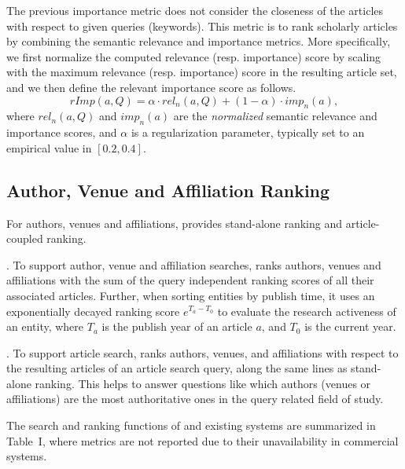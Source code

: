  The previous importance metric does not consider the closeness of the articles with respect to given queries (keywords). This metric is to rank scholarly articles by combining the semantic relevance and importance metrics. More specifically, we first normalize the computed relevance (resp. importance) score by scaling with the maximum relevance (resp. importance) score in the resulting article set, and we then define the relevant importance score as follows.
\begin{equation}
\label{eq:relimp}
rImp(a, Q) = \alpha \cdot rel_n(a, Q) + (1-\alpha)\cdot imp_n(a),
\end{equation}
where $rel_n(a, Q)$ and $imp_n(a)$ are the {\em normalized} semantic relevance and importance scores, and $\alpha$ is a regularization parameter, typically set to an empirical value in $[0.2, 0.4]$.



\subsection{Author, Venue and Affiliation Ranking}
\label{subsec:heteroRanking}

For authors, venues and affiliations,  \oursystem provides stand-alone ranking and article-coupled ranking.

. To support author, venue and affiliation searches, \oursystem ranks authors, venues and affiliations with the sum of the query independent ranking scores of all their associated articles. Further, when sorting entities by publish time, it uses an exponentially decayed ranking score $e^{T_a-T_0}$ to evaluate the research activeness of an entity, where $T_a$ is the publish year of an article $a$, and $T_0$ is the current year.

. To support article search, \oursystem ranks authors, venues, and affiliations with respect to the resulting articles of an article search query, along the same lines as stand-alone ranking. This helps to answer questions like which authors (venues or affiliations) are the most authoritative ones in the query related field of study.


The search and ranking functions of \oursystem and existing systems are summarized in Table~I, where metrics are not reported due to their unavailability in commercial systems.



